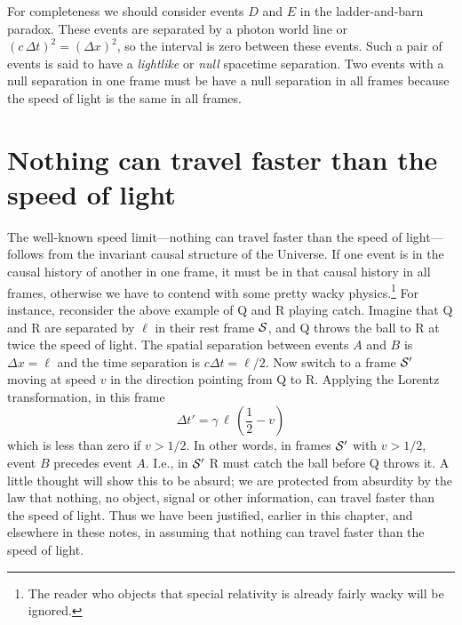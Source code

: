 For completeness we should consider events $D$ and $E$ in the
ladder-and-barn paradox.  These events are separated by a photon world
line or $(c\,\Delta t)^2=(\Delta x)^2$, so the interval is zero
between these events.  Such a pair of events is said to have a {\em
lightlike\/} or {\em null\/} spacetime separation.  Two events with a
null separation in one frame must be have a null separation in all
frames because the speed of light is the same in all frames.


\section{Nothing can travel faster than the speed of light}
\label{sec:speedlimit}

The well-known speed limit---nothing can travel faster than the speed
of light---follows from the invariant causal structure of the
Universe.  If one event is in the causal history of another in one
frame, it must be in that causal history in all frames, otherwise we
have to contend with some pretty wacky physics.\footnote{The reader
who objects that special relativity is already fairly wacky will be
ignored.}  For instance, reconsider the above example of Q and R
playing catch.  Imagine that Q and R are separated by $\ell$ in their
rest frame $\cal S$, and Q throws the ball to R at twice the speed of
light.  The spatial separation between events $A$ and $B$ is $\Delta
x=\ell$ and the time separation is $c\Delta t=\ell/2$.  Now switch to
a frame $\cal S'$ moving at speed $v$ in the direction pointing from
Q to R.  Applying the Lorentz transformation, in this frame
\begin{equation}
\Delta t'=\gamma\,\ell\,\left(\frac{1}{2}-v\right)
\end{equation}
which is less than zero if $v>1/2$.  In other words, in frames
$\cal S'$ with $v>1/2$, event $B$ precedes event $A$.  I.e., in
$\cal S'$ R must catch the ball before Q throws it.  A little thought
will show this to be absurd; we are protected from absurdity by the
law that nothing, no object, signal or other information, can travel
faster than the speed of light.  Thus we have been justified, earlier
in this chapter, and elsewhere in these notes, in assuming that
nothing can travel faster than the speed of light.

